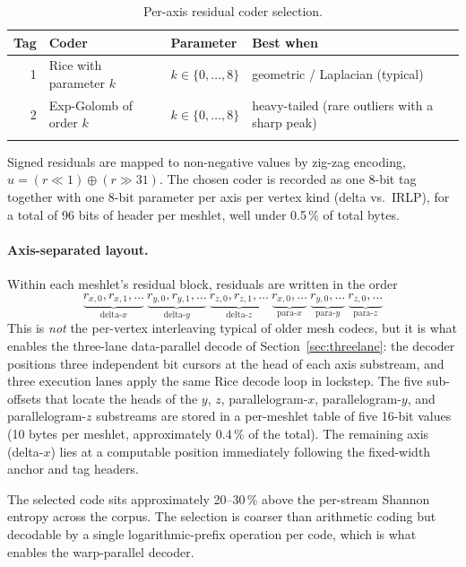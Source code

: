 \documentclass[pdflatex,sn-vancouver-num]{sn-jnl}%
\theoremstyle{thmstyleone}%
\theoremstyle{thmstyletwo}%
\theoremstyle{thmstylethree}%
\begin{document}
\begin{table}[ht]
\caption{Per-axis residual coder selection.}\label{tab:coders}
\begin{tabular*}{\textwidth}{@{\extracolsep\fill}rlll@{}}
\toprule
Tag & Coder & Parameter & Best when \\
\midrule
1 & Rice with parameter $k$       & $k \in \{0, \ldots, 8\}$ & geometric / Laplacian (typical) \\
2 & Exp-Golomb of order $k$        & $k \in \{0, \ldots, 8\}$ & heavy-tailed (rare outliers with a sharp peak) \\
\botrule
\end{tabular*}
\end{table}

Signed residuals are mapped to non-negative values by zig-zag encoding, $u = (r \ll 1) \oplus (r \gg 31)$. The chosen coder is recorded as one 8-bit tag together with one 8-bit parameter per axis per vertex kind (delta vs.\ IRLP), for a total of 96 bits of header per meshlet, well under 0.5\,\% of total bytes.

\paragraph{Axis-separated layout.}
Within each meshlet's residual block, residuals are written in the order
\[
\underbrace{r_{x,0}, r_{x,1}, \ldots}_{\text{delta-}x}\
\underbrace{r_{y,0}, r_{y,1}, \ldots}_{\text{delta-}y}\
\underbrace{r_{z,0}, r_{z,1}, \ldots}_{\text{delta-}z}\
\underbrace{r_{x,0}, \ldots}_{\text{para-}x}\
\underbrace{r_{y,0}, \ldots}_{\text{para-}y}\
\underbrace{r_{z,0}, \ldots}_{\text{para-}z}
\]
This is \emph{not} the per-vertex interleaving typical of older mesh codecs, but it is what enables the three-lane data-parallel decode of Section~\ref{sec:threelane}: the decoder positions three independent bit cursors at the head of each axis substream, and three execution lanes apply the same Rice decode loop in lockstep. The five sub-offsets that locate the heads of the $y$, $z$, parallelogram-$x$, parallelogram-$y$, and parallelogram-$z$ substreams are stored in a per-meshlet table of five 16-bit values (10 bytes per meshlet, approximately 0.4\,\% of the total). The remaining axis (delta-$x$) lies at a computable position immediately following the fixed-width anchor and tag headers.

The selected code sits approximately 20--30\,\% above the per-stream Shannon entropy across the corpus. The selection is coarser than arithmetic coding but decodable by a single logarithmic-prefix operation per code, which is what enables the warp-parallel decoder.
\end{document}
